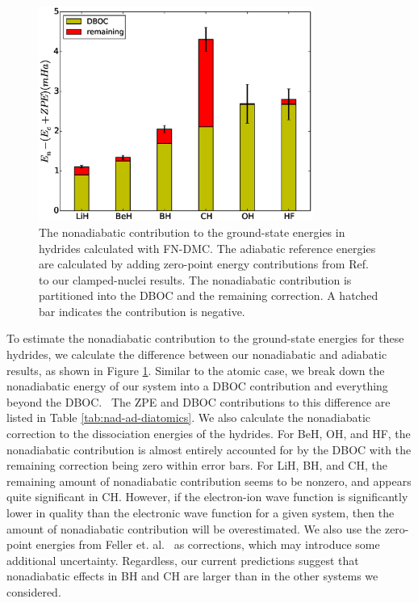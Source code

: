 \begin{figure}[h]
\includegraphics[width=0.8\textwidth]{dia-nad-ad}
\caption{The nonadiabatic contribution to the ground-state energies in hydrides calculated with FN-DMC. The adiabatic reference energies are calculated by adding zero-point energy contributions from Ref.~\cite{Feller_Corrections} to our clamped-nuclei results. The nonadiabatic contribution is partitioned into the DBOC and the remaining correction. A hatched bar indicates the contribution is negative. \label{fig:dia-nad-ad}}
\end{figure}

To estimate the nonadiabatic contribution to the ground-state energies for these hydrides, we calculate the difference between our nonadiabatic and adiabatic results, as shown in Figure \ref{fig:dia-nad-ad}. Similar to the atomic case, we break down the nonadiabatic energy of our system into a DBOC contribution and everything beyond the DBOC.~\cite{CFOUR,Harding,Feller_DBOC} The ZPE and DBOC contributions to this difference are listed in Table \ref{tab:nad-ad-diatomics}. We also calculate the nonadiabatic correction to the dissociation energies of the hydrides.
For BeH, OH, and HF, the nonadiabatic contribution is almost entirely accounted for by the DBOC with the remaining correction being zero within error bars. For LiH, BH, and CH, the remaining amount of nonadiabatic contribution seems to be nonzero, and appears quite significant in CH. However, if the electron-ion wave function is significantly lower in quality than the electronic wave function for a given system, then the amount of nonadiabatic contribution will be overestimated. We also use the zero-point energies from Feller et. al.~\cite{Feller_Corrections} as corrections, which may introduce some additional uncertainty.  Regardless, our current predictions suggest that nonadiabatic effects in BH and CH are larger than in the other systems we considered.

